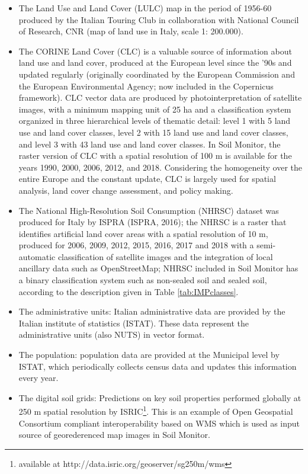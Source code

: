 \documentclass[APA,LATO1COL,doublespace]{WileyNJD-v2}
\begin{document}
\begin{itemize}
    \item The Land Use and Land Cover (LULC) map in the period of 1956-60 produced by the Italian Touring Club in collaboration with National Council of Research, CNR (map of land use in Italy, scale 1: 200.000).
    \item The CORINE Land Cover (CLC) is a valuable source of information about land use and land cover, produced at the European level since the '90s and updated regularly (originally coordinated by the European Commission and the European Environmental Agency; now included in the Copernicus framework).
    CLC vector data are produced by photointerpretation of satellite images, with a minimum mapping unit of 25 ha and a classification system organized in three hierarchical levels of thematic detail: level 1 with 5 land use and land cover classes, level 2 with 15 land use and land cover classes, and level 3 with 43 land use and land cover classes. 
    In Soil Monitor, the raster version of CLC with a spatial resolution of 100 m is available for the years 1990, 2000, 2006, 2012, and 2018. Considering the homogeneity over the entire Europe and the constant update, CLC is largely used for spatial analysis, land cover change assessment, and policy making.
    \item The National High-Resolution Soil Consumption (NHRSC) dataset was produced for Italy by ISPRA (ISPRA, 2016); the NHRSC is a raster that identifies artificial land cover areas with a spatial resolution of 10 m, produced for 2006, 2009, 2012, 2015, 2016, 2017 and 2018 with a semi-automatic classification of satellite images and the integration of local ancillary data such as OpenStreetMap; NHRSC included in Soil Monitor has a binary classification system such as non-sealed soil and sealed soil, according to the description given in Table \ref{tab:IMPclasses}.
    \item The administrative units: Italian administrative data are provided by the Italian institute of statistics (ISTAT). 
    These data represent the administrative units (also NUTS) in vector format.
    \item The population: population data are provided at the Municipal level by ISTAT, which periodically collects census data and updates this information every year. 
    \item The digital soil grids: Predictions on key soil properties performed globally at 250 m spatial resolution by ISRIC\footnote{available at http://data.isric.org/geoserver/sg250m/wms}. This is an example of Open Geospatial Consortium compliant interoperability based on WMS which is used as input source of georederenced map images in Soil Monitor.
\end{itemize}
\end{document}
